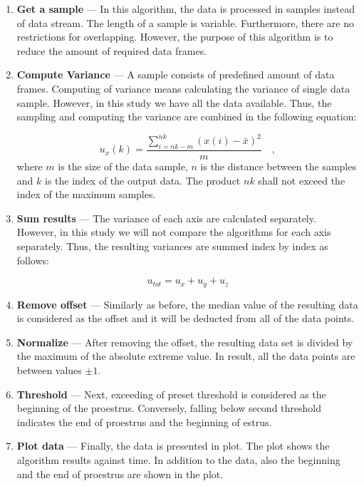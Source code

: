 \documentclass[english,12pt,a4paper,pdftex,elec,utf8]{aaltothesis}
\begin{document}
\begin{enumerate}

\item \textbf{Get a sample} --- In this algorithm, the data is processed in samples instead of data stream. The length of a sample is variable. Furthermore, there are no restrictions for overlapping. However, the purpose of this algorithm is to reduce the amount of required data frames.

\item \textbf{Compute Variance} --- A sample consists of predefined amount of data frames. Computing of variance means calculating the variance of single data sample. However, in this study we have all the data available. Thus, the sampling and computing the variance are combined in the following equation:

\begin{equation} \label{samplevariance}
u_x(k) = \frac{\sum \limits_{i=nk-m}^{nk} (x(i) - \bar{x})^2}{m} \mathrm{\hspace{1em},}
\end{equation}
where $m$ is the size of the data sample, $n$ is the distance between the samples and $k$ is the index of the output data. The product $nk$ shall not exceed the index of the maximum samples.

\item \textbf{Sum results} --- The variance of each axis are calculated separately. However, in this study we will not compare the algorithms for each axis separately. Thus, the resulting variances are summed index by index as follows:

\begin{equation}
u_{tot} = u_x + u_y + u_z
\end{equation}

\item \textbf{Remove offset} --- Similarly as before, the median value of the resulting data is considered as the offset and it will be deducted from all of the data points.


\item \textbf{Normalize} --- After removing the offset, the resulting data set is divided by the maximum of the absolute extreme value. In result, all the data points are between values $\pm 1$.

\item \textbf{Threshold} --- Next, exceeding of preset threshold is considered as the beginning of the proestrus. Conversely, falling below second threshold indicates the end of proestrus and the beginning of estrus.

\item \textbf{Plot data} --- Finally, the data is presented in plot. The plot shows the algorithm results against time. In addition to the data, also the beginning and the end of proestrus are shown in the plot.

\end{enumerate}
\end{document}
